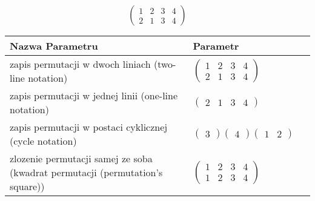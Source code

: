 \documentclass[12pt]{article}
\begin{document}
\subsection{}
\begin{center}
\[
\begin{pmatrix}
	1 & 2 & 3 & 4 \\ 
	2 & 1 & 3 & 4 
\end{pmatrix}
\]

\begin{tabular}{|m{0.6\linewidth}|m{0.4\linewidth}|}
	\hline
	Nazwa Parametru & Parametr \\
	\hline
	zapis permutacji w dwoch liniach (two-line notation) & $\begin{pmatrix} 1 & 2 & 3 & 4 \\ 
2 & 1 & 3 & 4 \end{pmatrix}$ \\ 
	\hline
	zapis permutacji w jednej linii (one-line notation) & $\begin{pmatrix} 2 & 1 & 3 & 4 \end{pmatrix}$ \\ 
	\hline
	zapis permutacji w postaci cyklicznej (cycle notation) & $\begin{pmatrix} 3 \end{pmatrix} \begin{pmatrix} 4 \end{pmatrix} \begin{pmatrix} 1 & 2 \end{pmatrix} $ \\ 
	\hline
	zlozenie permutacji samej ze soba (kwadrat permutacji (permutation's square)) & $\begin{pmatrix} 1 & 2 & 3 & 4 \\ 
1 & 2 & 3 & 4 \end{pmatrix}$ \\ 
	\hline
\end{tabular}
\end{center}
\end{document}
